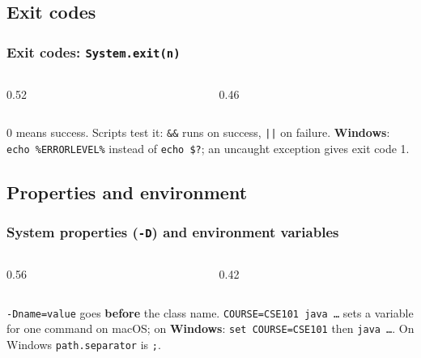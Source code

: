 \documentclass[aspectratio=169,10pt,compress]{beamer}
\newcommand{\win}{\textbf{Windows}}
\begin{document}
\subsection[Exit codes]{Exit codes}




\begin{frame}[t,fragile] \frametitle{Exit codes: \texttt{System.exit(n)}}
  \begin{columns}[T]
    \begin{column}{0.52\textwidth}
    \end{column}
    \begin{column}{0.46\textwidth}
    \end{column}
  \end{columns}

  \vspace{0.1em}
  \small 0 means success. Scripts test it: \texttt{\&\&} runs on success, \texttt{||} on failure.
  \win: \texttt{echo \%ERRORLEVEL\%} instead of \texttt{echo \$?}; an uncaught exception gives exit code 1.
\end{frame}

\subsection[Properties]{Properties and environment}




\begin{frame}[t,fragile] \frametitle{System properties (\texttt{-D}) and environment variables}
  \begin{columns}[T]
    \begin{column}{0.56\textwidth}
    \end{column}
    \begin{column}{0.42\textwidth}
    \end{column}
  \end{columns}

  \vspace{0.1em}
  \small \texttt{-Dname=value} goes \textbf{before} the class name. \texttt{COURSE=CSE101 java \dots} sets a variable for one
  command on macOS; on \win: \texttt{set COURSE=CSE101} then \texttt{java \dots}. On Windows \texttt{path.separator} is \texttt{;}.
\end{frame}
\end{document}
